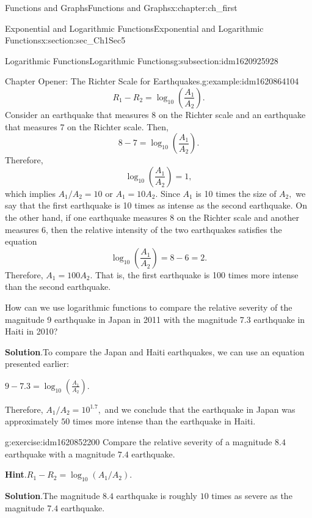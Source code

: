 \documentclass[oneside,10pt,]{book}
\newcommand{\blocktitlefont}{\relax}
\numberwithin{equation}{section}
\begin{document}
\begin{chapterptx}{Functions and Graphs}{}{Functions and Graphs}{}{}{x:chapter:ch_first}
\begin{sectionptx}{Exponential and Logarithmic Functions}{}{Exponential and Logarithmic Functions}{}{}{x:section:sec_Ch1Sec5}
\begin{subsectionptx}{Logarithmic Functions}{}{Logarithmic Functions}{}{}{g:subsection:idm1620925928}
\begin{example}{Chapter Opener: The Richter Scale for Earthquakes.}{g:example:idm1620864104}
%
\begin{equation*}
R_1-R_2=\log_{10}\left(\frac{A_1}{A_2}\right).
\end{equation*}
Consider an earthquake that measures 8 on the Richter scale and an earthquake that measures 7 on the Richter scale. Then,%
%
\begin{equation*}
8-7=\log_{10}\left(\frac{A_1}{A_2}\right).
\end{equation*}
Therefore,%
%
\begin{equation*}
\log_{10}\left(\frac{A_1}{A_2}\right)=1,
\end{equation*}
which implies \(A_1/A_2=10\) or \(A_1=10A_2.\) Since \(A_1\) is 10 times the size of \(A_2,\) we say that the first earthquake is 10 times as intense as the second earthquake. On the other hand, if one earthquake measures 8 on the Richter scale and another measures 6, then the relative intensity of the two earthquakes satisfies the equation%
%
\begin{equation*}
\log_{10}\left(\frac{A_1}{A_2}\right)=8-6=2.
\end{equation*}
Therefore, \(A_1=100A_2.\) That is, the first earthquake is 100 times more intense than the second earthquake.%
\par
How can we use logarithmic functions to compare the relative severity of the magnitude 9 earthquake in Japan in 2011 with the magnitude 7.3 earthquake in Haiti in 2010?%
\par\smallskip%
\noindent\textbf{\blocktitlefont Solution}.\hypertarget{g:solution:idm1620852712}{}\quad{}To compare the Japan and Haiti earthquakes, we can use an equation presented earlier:%
\par
\(9-7.3=\log_{10}\left(\frac{A_1}{A_2}\right).\)%
\par
Therefore, \(A_1/A_2=10^1.7,\) and we conclude that the earthquake in Japan was approximately \(50\) times more intense than the earthquake in Haiti.%
\end{example}
\begin{inlineexercise}{}{g:exercise:idm1620852200}%
Compare the relative severity of a magnitude \(8.4\) earthquake with a magnitude \(7.4\) earthquake.%
\par\smallskip%
\noindent\textbf{\blocktitlefont Hint}.\hypertarget{g:hint:idm1620850024}{}\quad{}\(R_1-R_2=\log_{10}\left(A_1/A_2\right).\)%
\par\smallskip%
\noindent\textbf{\blocktitlefont Solution}.\hypertarget{g:solution:idm1620847976}{}\quad{}The magnitude \(8.4\) earthquake is roughly \(10\) times as severe as the magnitude \(7.4\) earthquake.%
\end{inlineexercise}%
\end{subsectionptx}
\end{sectionptx}
\end{chapterptx}
\end{document}
